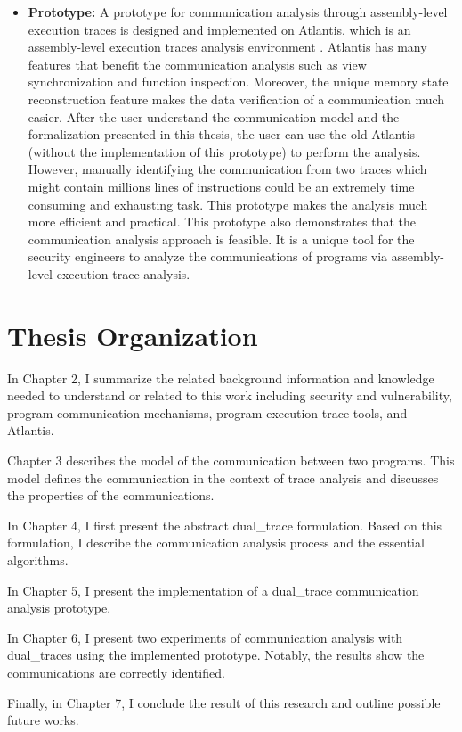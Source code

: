 \begin{itemize}
  \item \textbf{Prototype:} A prototype for communication analysis through assembly-level execution traces is designed and implemented on Atlantis, which is an assembly-level execution traces analysis environment \cite{huang2017atlantis}. Atlantis has many features that benefit the communication analysis such as view synchronization and function inspection. Moreover, the unique memory state reconstruction feature makes the data verification of a communication much easier. After the user understand the communication model and the formalization presented in this thesis, the user can use the old Atlantis (without the implementation of this prototype) to perform the analysis. However, manually identifying the communication from two traces which might contain millions lines of instructions could be an extremely time consuming and exhausting task. This prototype makes the analysis much more efficient and practical. This prototype also demonstrates that the communication analysis approach is feasible. It is a unique tool for the security engineers to analyze the communications of programs via assembly-level execution trace analysis. 
\end{itemize}

\section{Thesis Organization}
In Chapter 2, I summarize the related background information and knowledge needed to understand or related to this work including security and vulnerability, program communication mechanisms, program execution trace tools, and Atlantis. 

Chapter 3 describes the model of the communication between two programs. This model defines the communication in the context of trace analysis and discusses the properties of the communications. 

In Chapter 4, I first present the abstract dual\_trace formulation. Based on this formulation, I describe the communication analysis process and the essential algorithms.

In Chapter 5, I present the implementation of a dual\_trace communication analysis prototype. 

In Chapter 6, I present two experiments of communication analysis with dual\_traces using the implemented prototype. Notably, the results show the communications are correctly identified. 

Finally, in Chapter 7, I conclude the result of this research and outline possible future works.